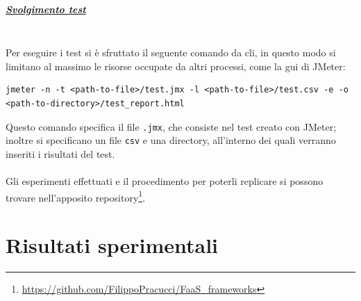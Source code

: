 \documentclass[12pt,a4paper,openany,twoside]{book}
\begin{document}
\paragraph{\underline{Svolgimento test}} ~\\
Per eseguire i test si è sfruttato il seguente comando da \ac{cli}, in questo modo si limitano al massimo le risorse occupate da altri processi, come la \ac{gui} di JMeter:
\begin{lstlisting}
jmeter -n -t <path-to-file>/test.jmx -l <path-to-file>/test.csv -e -o
<path-to-directory>/test_report.html\end{lstlisting}
Questo comando specifica il file \texttt{.jmx}, che consiste nel test creato con JMeter; inoltre si specificano un file \texttt{csv} e una directory, all'interno dei quali verranno inseriti i risultati del test.
\\ \\
Gli esperimenti effettuati e il procedimento per poterli replicare si possono trovare nell'apposito repository\footnote{\url{https://github.com/FilippoPracucci/FaaS_frameworks}}.


\chapter{Risultati sperimentali}
\label{chap:risultati-sperimentali}
\end{document}
